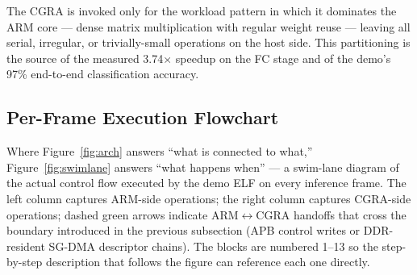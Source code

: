 The CGRA is invoked only for the workload pattern in which it dominates
the ARM core --- dense matrix multiplication with regular weight reuse
--- leaving all serial, irregular, or trivially-small operations on
the host side. This partitioning is the source of the measured
3.74$\times$ speedup on the FC stage and of the demo's 97\% end-to-end
classification accuracy.

\subsection{Per-Frame Execution Flowchart}
\label{ssec:flowchart}

Where Figure~\ref{fig:arch} answers ``what is connected to what,''
Figure~\ref{fig:swimlane} answers ``what happens when'' --- a swim-lane
diagram of the actual control flow executed by the demo ELF on every
inference frame. The left column captures ARM-side operations; the
right column captures CGRA-side operations; dashed green arrows
indicate ARM$\leftrightarrow$CGRA handoffs that cross the boundary
introduced in the previous subsection (APB control writes or
DDR-resident SG-DMA descriptor chains). The blocks are numbered 1--13
so the step-by-step description that follows the figure can reference
each one directly.

